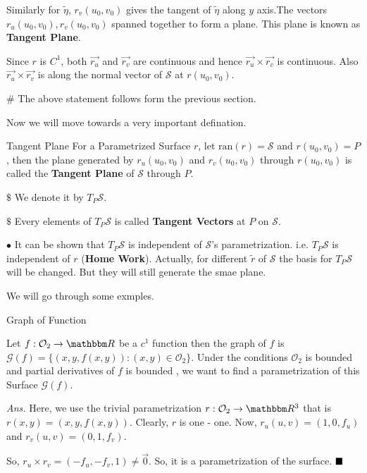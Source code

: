 \documentclass[Analysis-3]{subfiles}
\begin{document}
\vspace{0.2cm}

Similarly for $\tilde{\eta}$, $r_v(u_0,v_0)$  gives the tangent of $\tilde{\eta}$ along $y$ axis.The vectors $r_u(u_0,v_0),r_v(u_0,v_0)$ spanned together to form a plane. This plane is known as \textbf{Tangent Plane}.

\vspace{0.2cm}

Since $r$ is $C^1$, both $\vec{r_u}$ and $\vec{r_v}$ are continuous and hence $\vec{r_u} \times \vec{r_v}$ is continuous. Also $\vec{r_u} \times \vec{r_v}$ is along the normal vector of $\mathcal{S}$ at $r(u_0,v_0)$.

\vspace{0.2cm}

$\#$ The above statement follows form the previous section. 

Now we will move towards a very important defination.

\begin{Def}{Tangent Plane}{}
    For a Parametrized Surface $r$, let $\text{ran}(r)=\mathcal{S}$ and $r(u_0,v_0)=P$, then the plane generated by $r_u(u_0,v_0)$ and $r_v(u_0,v_0)$ through $r(u_0,v_0)$ is called the \textbf{Tangent Plane} of $\mathcal{S}$ through $P$. 
    
    \vspace{0.2cm}

    $\$$ We denote it by $T_P\mathcal{S}$.

    $\$$ Every elements of $T_P\mathcal{S}$ is called \textbf{Tangent Vectors} at $P$ on $\mathcal{S}$.
\end{Def}

$\bullet$ It can be shown that $T_P\mathcal{S}$ is independent of $\mathcal{S}$'s parametrization. i.e. $T_P\mathcal{S}$ is independent of $r$ (\textbf{Home Work}). Actually, for different $\tilde{r}$ of $\mathcal{S}$ the basis for $T_P\mathcal{S}$ will be changed. But they will still generate the smae plane.

\vspace{0.2cm}

We will go through some exmples.

\begin{Eg}{Graph of Function}{}\label{eg:grp}
  
    Let $f : \mathcal{O}_2 \to \R$ be a $c^1$ function then the graph of $f$ is $\mathcal{G}(f) = \{ (x,y,f(x,y)) : (x,y)\in \mathcal{O}_2\}$. Under the conditions $\mathcal{O}_2$ is bounded and partial derivatives of $f$ is bounded , we want to find a parametrization of this Surface $\mathcal{G}(f)$. 
      
    \vspace{0.2cm}

    \textit{Ans.} Here, we use the trivial parametrization $r : \mathcal{O}_2 \to \R^3$ that is $ r(x,y) = (x,y,f(x,y))$. Clearly, $r$ is one - one. Now, $r_u(u,v) = (1,0,f_u)$ and $r_v(u,v) = (0,1,f_v)$. 

    \vspace{0.2cm}

    So, $ r_u \times r_v = (-f_u,-f_v,1) \neq \vec{0}$. So, it is a parametrization of the surface. $\hfill \blacksquare$
\end{Eg}
\end{document}
